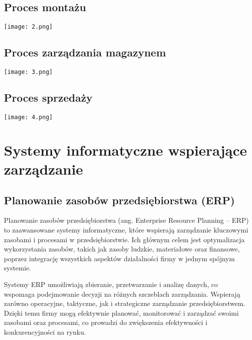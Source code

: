 \subsection{Proces montażu}
\begin{center}
    \texttt{[image: 2.png]}\\[0.5cm]
\end{center}
\subsection{Proces zarządzania magazynem}
\begin{center}
    \texttt{[image: 3.png]}\\[0.5cm]
\end{center}
\subsection{Proces sprzedaży}
\begin{center}
    \texttt{[image: 4.png]}\\[0.5cm]
\end{center}

\section{Systemy informatyczne wspierające zarządzanie}
\subsection{Planowanie zasobów przedsiębiorstwa (ERP)}

Planowanie zasobów przedsiębiorstwa (ang. Enterprise Resource Planning – ERP) to zaawansowane systemy informatyczne, które wspierają zarządzanie kluczowymi zasobami i procesami w przedsiębiorstwie. Ich głównym celem jest optymalizacja wykorzystania zasobów, takich jak zasoby ludzkie, materiałowe oraz finansowe, poprzez integrację wszystkich aspektów działalności firmy w jednym spójnym systemie.

Systemy ERP umożliwiają zbieranie, przetwarzanie i analizę danych, co wspomaga podejmowanie decyzji na różnych szczeblach zarządzania. Wspierają zarówno operacyjne, taktyczne, jak i strategiczne zarządzanie przedsiębiorstwem. Dzięki temu firmy mogą efektywnie planować, monitorować i zarządzać swoimi zasobami oraz procesami, co prowadzi do zwiększenia efektywności i konkurencyjności na rynku.

